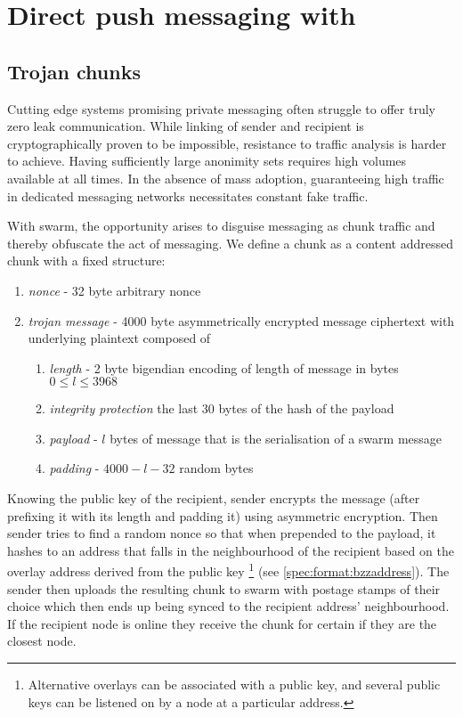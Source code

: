\section{Direct push messaging with}\label{sec:pss}

\subsection{Trojan chunks}\label{sec:trojan}

Cutting edge systems promising private messaging often struggle to offer truly zero leak communication. While linking of sender and recipient is cryptographically proven to be impossible, resistance to traffic analysis is harder to achieve. Having sufficiently large anonimity sets requires high volumes available at all times. In the absence of mass adoption, guaranteeing high traffic in dedicated messaging networks necessitates constant fake traffic. 

With swarm, the opportunity arises to disguise messaging as chunk traffic and thereby obfuscate the act of messaging. We define a  chunk as a content addressed chunk with a fixed structure:

\begin{enumerate}
    \item \emph{nonce} - 32 byte arbitrary nonce 
    \item \emph{trojan  message} - 4000 byte asymmetrically encrypted message ciphertext with underlying plaintext composed of
    \begin{enumerate}
        \item \emph{length} - 2 byte bigendian encoding of length of message in bytes $0\leq l\leq 3968$
        \item \emph{integrity protection} the last 30 bytes of the hash of the payload 
        \item \emph{payload} - $l$ bytes of message that is the serialisation of a swarm message
        \item \emph{padding} - $4000-l-32$ random bytes
    \end{enumerate}
\end{enumerate}

Knowing the public key of the recipient, sender encrypts the message (after prefixing it with its length and padding it) using asymmetric encryption. Then sender tries to find a random nonce so that when prepended to the payload, it hashes to an address that falls in the neighbourhood of the recipient based on the overlay address derived from the public key%
%
\footnote{Alternative overlays can be associated with a public key, and several public keys can be listened on by a node at a particular address.}
%
(see \ref{spec:format:bzzaddress}). The sender then uploads the resulting chunk to swarm with postage stamps of their choice which then ends up being synced to the recipient address' neighbourhood. If the recipient node is online they receive the chunk for certain if they are the closest node. 

